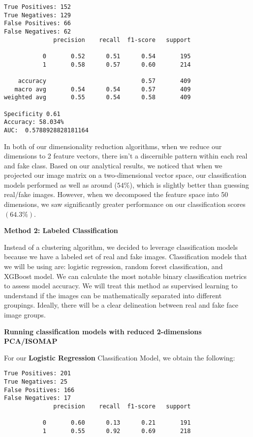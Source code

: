 \documentclass{article}
\begin{document}
\begin{titlepage}
\begin{itemize}
\begin{verbatim}
True Positives: 152
True Negatives: 129
False Positives: 66
False Negatives: 62
              precision    recall  f1-score   support

           0       0.52      0.51      0.54       195
           1       0.58      0.57      0.60       214

    accuracy                           0.57       409
   macro avg       0.54      0.54      0.57       409
weighted avg       0.55      0.54      0.58       409

Specificity 0.61
Accuracy: 58.034%
AUC:  0.5788928828181164
\end{verbatim}

In both of our dimensionality reduction algorithms, when we reduce our dimensions to 2 feature vectors, there isn't a discernible pattern within each real and fake class. Based on our analytical results, we noticed that when we projected our image matrix on a two-dimensional vector space, our classification models performed as well as around ($54\%$), which is slightly better than guessing real/fake images. However, when we decomposed the feature space into 50 dimensions, we saw significantly greater performance on our classification scores $(64.3\%)$.

\newpage


    \textbf{Method 2: Labeled Classification}

    Instead of a clustering algorithm, we decided to leverage classification models because we have a labeled set of real and fake images. Classification models that we will be using are: logistic regression, random forest classification, and XGBoost model. We can calculate the most notable binary classification metrics to assess model accuracy. We will treat this method as supervised learning to understand if the images can be mathematically separated into different groupings. Ideally, there will be a clear delineation between real and fake face image groups.


\textbf{Running classification models with reduced 2-dimensions PCA/ISOMAP}

For our \textbf{Logistic Regression} Classification Model, we obtain the following:

\begin{verbatim}
True Positives: 201
True Negatives: 25
False Positives: 166
False Negatives: 17
              precision    recall  f1-score   support

           0       0.60      0.13      0.21       191
           1       0.55      0.92      0.69       218


\end{verbatim}
\end{itemize}
\end{titlepage}
\end{document}
